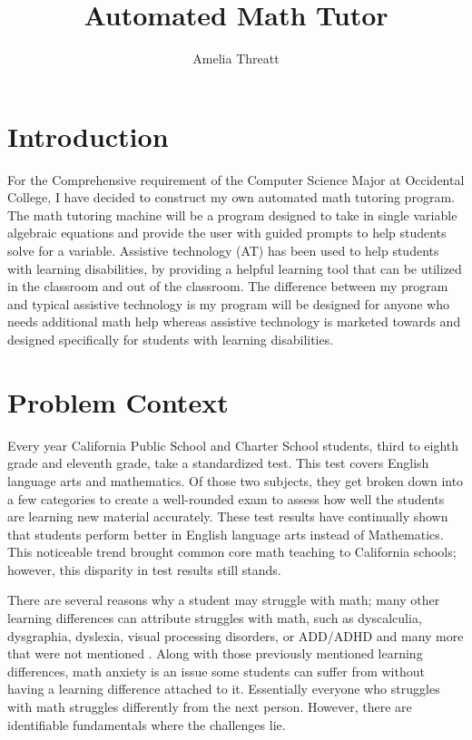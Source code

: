 \documentclass[10pt,twocolumn]{article}
\title{Automated Math Tutor}
\author{Amelia Threatt}
\affiliation{Occidental College}
\begin{document}
\newtheorem{proof}{Proof}

\maketitle
\section{Introduction}
For the Comprehensive requirement of the Computer Science Major at Occidental College, I have decided to construct my own automated  math tutoring program. The math tutoring machine will be a program designed to take in single variable algebraic equations and provide the user with guided prompts to help students solve for a variable. Assistive technology (AT) has been used to help students with learning disabilities, by providing a helpful learning tool that can be utilized in the classroom and out of the classroom. The difference between my program and typical assistive technology is my program will be designed for anyone who needs additional math help whereas assistive technology is marketed towards and designed specifically for students with learning disabilities. 


\section{Problem Context}
Every year California Public School and Charter School students, third to eighth grade and eleventh grade, take a standardized test. This test covers English language arts and mathematics. Of those two subjects, they get broken down into a few categories to create a well-rounded exam to assess how well the students are learning new material accurately. These test results have continually shown that students perform better in English language arts instead of Mathematics. This noticeable trend brought common core math teaching to California schools; however, this disparity in test results still stands. \cite{noauthor_california_nodate}
 
There are several reasons why a student may struggle with math; many other learning differences can attribute struggles with math, such as dyscalculia, dysgraphia, dyslexia, visual processing disorders, or ADD/ADHD and many more that were not mentioned \cite{noauthor_why_nodate}. Along with those previously mentioned learning differences, math anxiety is an issue some students can suffer from without having a learning difference attached to it. Essentially everyone who struggles with math struggles differently from the next person. However, there are identifiable fundamentals where the challenges lie.  
 
\end{document}

